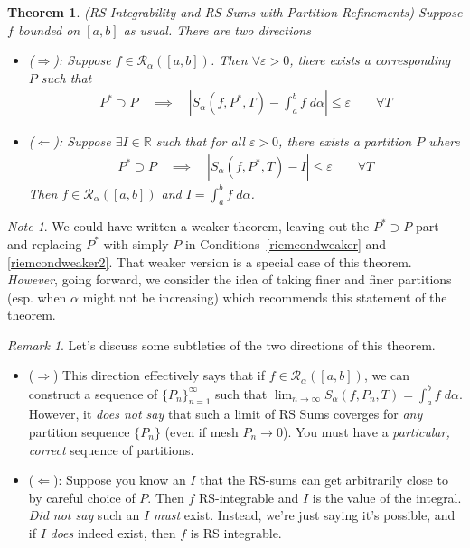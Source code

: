 \documentclass[12pt]{article}
\numberwithin{equation}{section} %
\theoremstyle{plain}
\newtheorem{thm}{Theorem}[section]
\theoremstyle{definition}
\theoremstyle{remark}
\newtheorem*{rmk}{Remark}
\newtheorem*{note}{Note}
\newcommand{\limn}{\lim_{n\rightarrow\infty}}
\newcommand{\ra}{\rightarrow}
\newcommand{\sR}{\mathscr{R}}
\newcommand{\R}{\mathbb{R}}
\begin{document}
\begin{thm}
\emph{(RS Integrability and RS Sums with Partition Refinements)}
\label{weaker}
Suppose $f$ bounded on $[a,b]$ as usual.
There are two directions
\begin{itemize}
  \item \emph{($\Rightarrow$)}:
    Suppose $f\in\sR_\alpha([a,b])$.
    Then $\forall\varepsilon>0$, there exists a corresponding $P$ such
    that
    \begin{align}
      P^*\supset P\quad\implies\quad
      \left\lvert S_\alpha(f,P^*,T) - \int^b_af\;d\alpha \right\rvert
      \leq \varepsilon \qquad \forall T
      \label{riemcondweaker}
    \end{align}
  \item \emph{($\Leftarrow$)}:
    Suppose $\exists I\in\R$ such that for all $\varepsilon>0$, there
    exists a partition $P$ where
    \begin{align}
      P^*\supset P\quad\implies\quad
      \left\lvert S_\alpha(f,P^*,T) - I \right\rvert
      \leq \varepsilon \qquad \forall T
      \label{riemcondweaker2}
    \end{align}
    Then $f\in\mathscr{R}_\alpha([a,b])$ and
     $I = \int^b_a f\;d\alpha$.
\end{itemize}
\end{thm}
\begin{note}
We could have written a weaker theorem, leaving out the $P^*\supset P$
part and replacing $P^*$ with simply $P$ in
Conditions~\ref{riemcondweaker} and \ref{riemcondweaker2}.
That weaker version is a special case of this theorem.
\emph{However}, going forward, we consider the idea of taking
finer and finer partitions (esp. when $\alpha$ might not be increasing)
which recommends this statement of the theorem.
\end{note}
\begin{rmk}
Let's discuss some subtleties of the two directions of this theorem.
\begin{itemize}
  \item ($\Rightarrow$)
    This direction effectively says that if $f\in\sR_\alpha([a,b])$,
    we can construct a sequence of $\{P_n\}_{n=1}^\infty$ such that
    $\limn S_\alpha(f,P_n,T)=\int^b_af\;d\alpha$.
    However, it \emph{does not say} that such a limit of RS Sums
    coverges for \emph{any} partition sequence $\{P_n\}$ (even if mesh
    $P_n\ra 0$).
    You must have a \emph{particular, correct} sequence of partitions.

  \item
    ($\Leftarrow$):
    Suppose you know an $I$ that the RS-sums can get arbitrarily
    close to by careful choice of $P$.
    Then $f$ RS-integrable and $I$ is the value of the integral.
    \emph{Did not say} such an $I$ \emph{must} exist.
    Instead, we're just saying it's possible, and if $I$ \emph{does}
    indeed exist, then $f$ is RS integrable.
\end{itemize}
\end{rmk}
\end{document}
